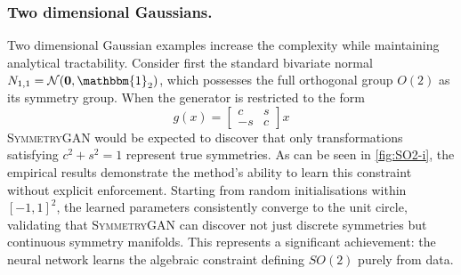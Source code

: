             \subsubsection{Two dimensional Gaussians.}
                Two dimensional Gaussian examples increase the complexity while maintaining analytical tractability.
                Consider first the standard bivariate normal \(N_{1, 1} = \mathcal{N}(\mathbf{0}, \mathbbm{1}_2)\), which possesses the full orthogonal group \(O(2)\) as its symmetry group.
                When the generator is restricted to the form
{\setlength{\arraycolsep}{12pt}
\[
  \label{eq:SO2_generator}
  g(x)=\begin{bmatrix}
     c & s\\
    -s & c
  \end{bmatrix}x
\]
}
                \textsc{SymmetryGAN} would be expected to discover that only transformations satisfying \(c^2 + s^2 = 1\) represent true symmetries.
                As can be seen in \cref{fig:SO2-i}, the empirical results demonstrate the method's ability to learn this constraint without explicit enforcement.
                Starting from random initialisations within \([-1, 1]^2\), the learned parameters consistently converge to the unit circle, validating that \textsc{SymmetryGAN} can discover not just discrete symmetries but continuous symmetry manifolds.
                This represents a significant achievement: the neural network learns the algebraic constraint defining \(SO(2)\) purely from data.
